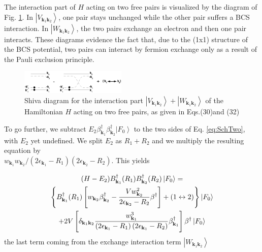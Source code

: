 \documentclass[epj]{svjour}
\begin{document}
The interaction part of $H$ acting on two free pairs is  visualized by
the diagram of Fig. \ref{fig:twoP}. In $\left|V_{\mathbf{k} _1\mathbf{k} _2}\right>$, one pair stays unchanged while the other pair suffers a BCS interaction. In $\left|W_{\mathbf{k} _1\mathbf{k} _2}\right>$, the two pairs exchange an electron and then one pair interacts.   These diagrams evidence the fact that,
due to the (1x1) structure of the BCS potential,  two pairs 
can  interact by fermion exchange only as a result of the
Pauli exclusion principle.

\begin{figure}[htb]
   \includegraphics[width=0.45\textwidth]{twoPair.eps}
\caption{Shiva diagram for the interaction part $\left|V_{\mathbf{k} _1\mathbf{k} _2}\right>+\left|W_{\mathbf{k} _1\mathbf{k} _2}\right>$ of the Hamiltonian $H$ acting on two free pairs, as given in Eqs.(30)and (32)}
\label{fig:twoP}
\end{figure}


To go further, we subtract $E _2\beta^{\dagger}_{\mathbf{k}
_1}\beta^{\dagger}_{\mathbf{k} _2}\left|F_0\right>  $ to the two sides of Eq.%
\eqref{eq:SchTwo}, with $E _2$ yet undefined. We split $E _2$ as $R_1+R_2$ and we multiply
the resulting equation by \\$w_{\mathbf{k} _1}w_{\mathbf{k} _2}/\left(2%
\epsilon_{\mathbf{k} _1}-R_1\right) \left(2\epsilon_{\mathbf{k}
_2}-R_2\right) $. This yields


\begin{multline}  \label{eq:SchTwo2}
(H-E _2)B^{\dagger}_{\mathbf{k} _1}(R_1)B^{\dagger}_{\mathbf{k}
_2}(R_2)\left|F_0\right>   = \\
\left\{B^{\dagger}_{\mathbf{k} _1}(R_1)\left[w_{\mathbf{k}
_2}\beta^{\dagger}_{\mathbf{k} _2}-\frac{Vw_{\mathbf{k} _2}^2}{2\epsilon_{%
\mathbf{k} _2}-R_2}\beta^{\dagger}\right]+(1\leftrightarrow2)\right\}
\left|F_0\right>  \\
+2V\left[\delta_{{\mathbf{k} _1}{\mathbf{k} _2}}\frac{w^3_{{\mathbf{k} _1}}}{\left(2%
\epsilon_{\mathbf{k} _1}-R_1\right) \left(2\epsilon_{\mathbf{k}
_1}-R_2\right)}\beta^\dagger_{{\mathbf{k} _1}}\right]\beta^\dagger\left|F_0\right>  
\end{multline}
the last term coming from the exchange interaction term $\left|W_{\mathbf{k} _1\mathbf{k} _2}\right>$
\end{document}
